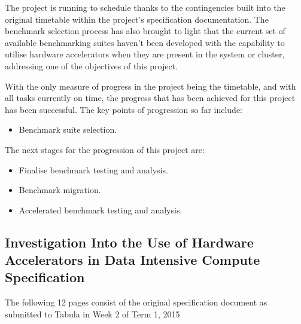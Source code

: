 \documentclass[12pt,a4paper]{article}
\begin{document}
        The project is running to schedule thanks to the contingencies built into the original timetable within the project's specification documentation. The benchmark selection process has also brought to light that the current set of available benchmarking suites haven't been developed with the capability to utilise hardware accelerators when they are present in the system or cluster, addressing one of the objectives of this project. 

        With the only measure of progress in the project being the timetable, and with all tasks currently on time, the progress that has been achieved for this project has been successful. The key points of progression so far include:

        \begin{itemize}
            \item Benchmark suite selection.
        \end{itemize}

        The next stages for the progression of this project are:

        \begin{itemize}
            \item Finalise benchmark testing and analysis.
            \item Benchmark migration.
            \item Accelerated benchmark testing and analysis.
        \end{itemize}

	\printbibliography
	
    \clearpage
	\begin{appendices}
	    \section{Investigation Into the Use of Hardware Accelerators in Data Intensive Compute Specification}
	    The following 12 pages consist of the original specification document as submitted to Tabula in Week 2 of Term 1, 2015
	    \label{app:specification}
	    
	        
	\end{appendices}
\end{document}
